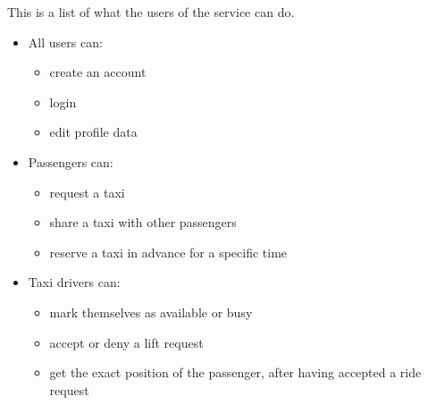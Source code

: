This is a list of what the users of the service can do.
\begin{itemize}
    \item All users can:
        \begin{itemize}
            \item create an account
            \item login
            \item edit profile data
        \end{itemize}
    \item Passengers can:
        \begin{itemize}
            \item request a taxi
            \item share a taxi with other passengers
            \item reserve a taxi in advance for a specific time
        \end{itemize}
    \item Taxi drivers can:
        \begin{itemize}
            \item mark themselves as available or busy
            \item accept or deny a lift request
            \item get the exact position of the passenger, after having accepted a ride request
        \end{itemize}
\end{itemize}
